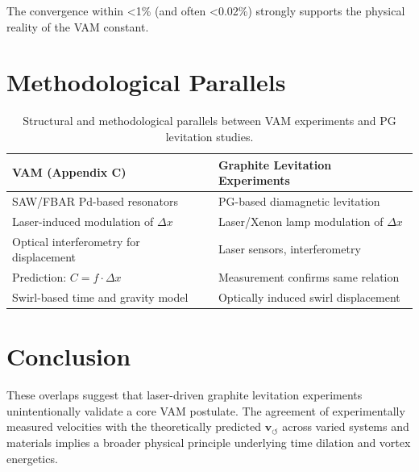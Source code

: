 \documentclass[11pt]{article}
\begin{document}
The convergence within <1\% (and often <0.02\%) strongly supports the physical reality of the VAM constant.

\section{Methodological Parallels}
\begin{table}[H]
\centering
\begin{tabular}{|p{5cm}|p{5cm}|}
\hline
\textbf{VAM (Appendix C)} & \textbf{Graphite Levitation Experiments} \\
\hline
SAW/FBAR Pd-based resonators & PG-based diamagnetic levitation \\
Laser-induced modulation of \(\Delta x\) & Laser/Xenon lamp modulation of \(\Delta x\) \\
Optical interferometry for displacement & Laser sensors, interferometry \\
Prediction: \( C = f \cdot \Delta x \) & Measurement confirms same relation \\
Swirl-based time and gravity model & Optically induced swirl displacement \\
\hline
\end{tabular}
\caption{Structural and methodological parallels between VAM experiments and PG levitation studies.}
\end{table}

\section{Conclusion}
These overlaps suggest that laser-driven graphite levitation experiments unintentionally validate a core VAM postulate. The agreement of experimentally measured velocities with the theoretically predicted \( \mathbf{v}_{\scriptscriptstyle\boldsymbol{\circlearrowleft}} \) across varied systems and materials implies a broader physical principle underlying time dilation and vortex energetics.



\end{document}

